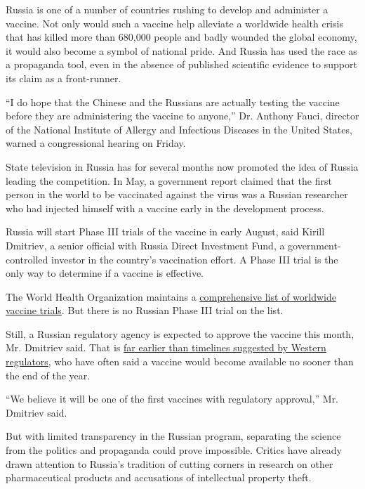 Russia is one of a number of countries rushing to develop and administer
a vaccine. Not only would such a vaccine help alleviate a worldwide
health crisis that has killed more than 680,000 people and badly wounded
the global economy, it would also become a symbol of national pride. And
Russia has used the race as a propaganda tool, even in the absence of
published scientific evidence to support its claim as a front-runner.

``I do hope that the Chinese and the Russians are actually testing the
vaccine before they are administering the vaccine to anyone,'' Dr.
Anthony Fauci, director of the National Institute of Allergy and
Infectious Diseases in the United States, warned a congressional hearing
on Friday.

State television in Russia has for several months now promoted the idea
of Russia leading the competition. In May, a government report claimed
that the first person in the world to be vaccinated against the virus
was a Russian researcher who had injected himself with a vaccine early
in the development process.

Russia will start Phase III trials of the vaccine in early August, said
Kirill Dmitriev, a senior official with Russia Direct Investment Fund, a
government-controlled investor in the country's vaccination effort. A
Phase III trial is the only way to determine if a vaccine is effective.

The World Health Organization maintains a
\href{https://www.who.int/publications/m/item/draft-landscape-of-covid-19-candidate-vaccines}{comprehensive
list of worldwide vaccine trials}. But there is no Russian Phase III
trial on the list.

Still, a Russian regulatory agency is expected to approve the vaccine
this month, Mr. Dmitriev said. That is
\href{https://www.nytimes.com/interactive/2020/science/coronavirus-vaccine-tracker.html}{far
earlier than timelines suggested by Western regulators}, who have often
said a vaccine would become available no sooner than the end of the
year.

``We believe it will be one of the first vaccines with regulatory
approval,'' Mr. Dmitriev said.

But with limited transparency in the Russian program, separating the
science from the politics and propaganda could prove impossible. Critics
have already drawn attention to Russia's tradition of cutting corners in
research on other pharmaceutical products and accusations of
intellectual property theft.

